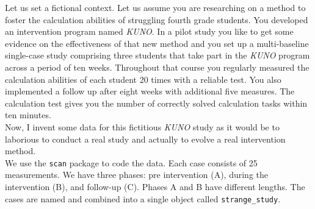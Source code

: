 \documentclass[
  letterpaper,
  DIV=11,
  numbers=noendperiod]{scrreprt}
\begin{document}
Let us set a fictional context. Let us assume you are researching on a
method to foster the calculation abilities of struggling fourth grade
students. You developed an intervention program named \emph{KUNO}. In a
pilot study you like to get some evidence on the effectiveness of that
new method and you set up a multi-baseline single-case study comprising
three students that take part in the \emph{KUNO} program across a period
of ten weeks. Throughout that course you regularly measured the
calculation abilities of each student 20 times with a reliable test. You
also implemented a follow up after eight weeks with additional five
measures. The calculation test gives you the number of correctly solved
calculation tasks within ten minutes.\\
Now, I invent some data for this fictitious \emph{KUNO} study as it
would be to laborious to conduct a real study and actually to evolve a
real intervention method.\\
We use the \texttt{scan} package to code the data. Each case consists of
25 measurements. We have three phases: pre intervention (A), during the
intervention (B), and follow-up (C). Phases A and B have different
lengths. The cases are named and combined into a single object called
\texttt{strange\_study}.
\end{document}
